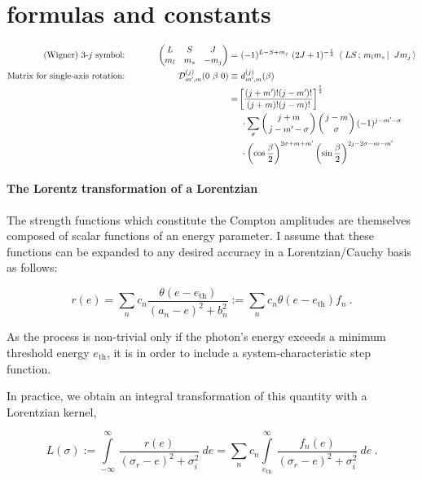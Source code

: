 \documentclass[onecolumn,preprint,superscriptaddress,nofootinbib,notitlepage,10pt,linenumbers]{revtex4-1}
\newcommand*{\mprime}{^{\prime}\mkern-1.2mu}
\newcommand{\be}{\begin{equation}}
\newcommand{\ee}{\end{equation}}
\newcommand{\la}{\label}
\newcommand{\threej}[6]{\ensuremath{\begin{pmatrix}#1 & #2 & #3\\#4&#5&#6 \end{pmatrix}}}
\newcommand{\clg}[6]{\ensuremath{\left\langle\left.\,#1#2\,;\,#3#4\,\right\vert\right.\left.\,#5#6\,\right\rangle}}
\begin{document}
\newpage

\section{formulas and constants}

\begin{alignat}{2}
\text{(Wigner) 3-$j$ symbol:} &\hspace{1cm}& \threej{L}{S}{J}{m_l}{m_s}{-m_j}=&~(-1)^{L-S+m_j}~(2J+1)^{-\frac{1}{2}}~\clg{L}{S}{m_l}{m_s}{J}{m_j}\\
\text{Matrix for single-axis rotation:} &\hspace{1cm}&   \mathcal{D}_{m\mprime,m}^{(j)}(0~\beta~0)\equiv&~d_{m\mprime,m}^{(j)}(\beta)\nonumber\\
&\hspace{1cm}& =&\left[\frac{(j+m\mprime)!(j-m\mprime)!}{(j+m)!(j-m)!}\right]^\frac{1}{2}\nonumber\\
&\hspace{1cm}&&~\cdot\sum_\sigma\left(j+m\atop j-m\mprime-\sigma\right)\left(j-m\atop \sigma\right)(-1)^{j-m\mprime-\sigma}\nonumber\\
&\hspace{1cm}&&~\cdot\left(\cos\frac{\beta}{2}\right)^{2\sigma+m+m\mprime}\left(\sin\frac{\beta}{2}\right)^{2j-2\sigma-m-m\mprime}\\
\end{alignat}

\paragraph{The Lorentz transformation of a Lorentzian\\}

The strength functions which constitute
the Compton amplitudes are themselves composed of scalar functions of an energy parameter.
I assume that these functions can be expanded to any desired accuracy in a Lorentzian/Cauchy
basis as follows:

\be\la{eq.responseexp}
r(e)=\sum_nc_n\frac{\theta(e-e_\text{th})}{(a_n-e)^2+b_n^2}:=\sum_nc_n\theta(e-e_\text{th})f_n~.
\ee

As the process is non-trivial only if the photon's energy exceeds a minimum threshold
energy $e_\text{th}$, it is in order to include a system-characteristic step function.

In practice, we obtain an integral transformation of this quantity with a Lorentzian kernel,

\be
L(\sigma):=\int\limits^\infty_{-\infty}\,\frac{r(e)}{(\sigma_r-e)^2+\sigma_i^2}~de
=\sum_nc_n\int\limits^\infty_{e_\text{th}}\,\frac{f_n(e)}{(\sigma_r-e)^2+\sigma_i^2}~de~.
\ee
\end{document}
